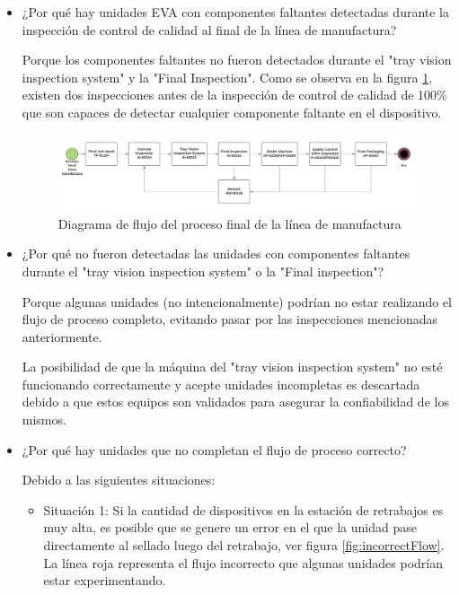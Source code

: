 \documentclass[12pt, twoside, letterpaper]{book}
\begin{document}
\begin{itemize}

    \item ¿Por qu\'e hay unidades EVA con componentes faltantes detectadas durante la inspecci\'on de control de calidad al final de la l\'inea de manufactura?
    
    Porque los componentes faltantes no fueron detectados durante el "tray vision inspection system" y la "Final Inspection". Como se observa en la figura \ref{fig:flowchart}, existen dos inspecciones antes de la inspecci\'on
    de control de calidad de 100\% que son capaces de detectar cualquier componente
    faltante en el dispositivo.
    
    \begin{figure}[H]
    \centering
    \includegraphics[width=1\textwidth]{flowchartEVA}
    \caption{Diagrama de flujo del proceso final de la l\'inea de manufactura}
    \label{fig:flowchart}
    \end{figure}
    
    \item ¿Por qu\'e no fueron detectadas las unidades con componentes faltantes durante el "tray vision inspection system" o la "Final inspection"?
    
    Porque algunas unidades (no intencionalmente) podr\'ian no estar realizando el flujo de proceso completo, evitando pasar por las inspecciones mencionadas anteriormente.
    
    La posibilidad de que la m\'aquina del "tray vision inspection system" no est\'e funcionando correctamente y acepte unidades incompletas es descartada debido a que
    estos equipos son validados para asegurar la confiabilidad de los mismos.
    
    \item ¿Por qu\'e hay unidades que no completan el flujo de proceso correcto? \par
    Debido a las siguientes situaciones:
    
        \begin{itemize}
        
            \item Situaci\'on 1: Si la cantidad de dispositivos en la estaci\'on de retrabajos es muy
            alta, es posible que se genere un error en el que la unidad pase directamente
            al sellado luego del retrabajo, ver figura \ref{fig:incorrectFlow}. La l\'inea roja representa el flujo
            incorrecto que algunas unidades podr\'ian estar experimentando.
            

\end{itemize}
\end{itemize}
\end{document}
